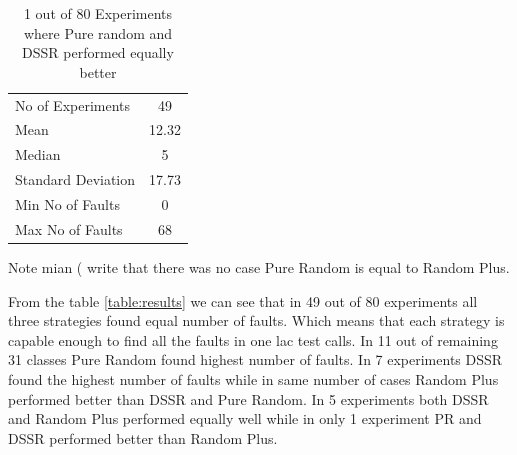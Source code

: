 \documentclass[conference]{IEEEtran}
\begin{document}

\begin{table}[H]
\caption{1 out of 80 Experiments where Pure random and DSSR performed equally better}
\centering
\begin{tabular}{|l|c|}
\hline\hline
No of Experiments 	& 49  	\\
Mean  			& 12.32  	\\
Median 			& 5 		\\
Standard Deviation 	& 17.73  	\\
Min No of Faults	&  0  		\\
Max No of Faults 	& 68  	\\
\hline
\end{tabular}
\label{table:nonlin}
\end{table}






Note mian ( write that there was no case Pure Random is equal to Random Plus.


From the table \ref{table:results} we can see that in 49 out of 80 experiments all three strategies found equal number of faults. Which means that each strategy is capable enough to find all the faults in one lac test calls. In 11 out of remaining 31 classes Pure Random found highest number of faults. In 7 experiments DSSR found the highest number of faults while in same number of cases Random Plus performed better than DSSR and Pure Random. In 5 experiments both DSSR and Random Plus performed equally well while in only 1 experiment PR and DSSR performed better than Random Plus. 
\end{document}
